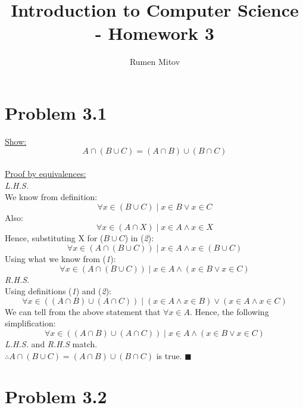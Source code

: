 \documentclass{article}
\title{\vspace{-2cm}Introduction to Computer Science - Homework 3}
\author{Rumen Mitov}
\begin{document}
\maketitle

\section*{Problem 3.1}
\underline{Show:} \[ A \cap (B \cup C) = (A \cap B) \cup (B \cap C)\] \\
\underline{Proof by equivalences:} \\
\textit{L.H.S.} \\
We know from definition: \\
\begin{equation}
\forall x \in (B \cup C) \mid x \in B \lor x \in C
\end{equation}
Also: \\
\begin{equation}
\forall x \in (A \cap X) \mid x \in A \land x \in X
\end{equation}
Hence, substituting X for ($B \cup C$) in (\textit{2}): \\
\[
\forall x \in (A \cap (B \cup C)) \mid x \in A \land x \in (B \cup C)
\]
Using what we know from (\textit{1}): \\
\[
\forall x \in (A \cap (B \cup C)) \mid x \in A \land (x \in B \lor x \in C)
\]
\textit{R.H.S.} \\
Using definitions (\textit{1}) and (\textit{2}): \\
\[
\forall x \in ((A \cap B) \cup (A \cap C)) \mid (x \in A \land x \in B) \lor (x \in A \land x \in C)
\]
We can tell from the above statement that $\forall x \in A$. Hence, the following simplification: \\
\[
\forall x \in ((A \cap B) \cup (A \cap C)) \mid x \in A \land (x \in B \lor x \in C)
\]
\textit{L.H.S.} and \textit{R.H.S} match. \\
$\therefore A \cap (B \cup C) = (A \cap B) \cup (B \cap C)$ is true. $\blacksquare$ \\

\section*{Problem 3.2}
\end{document}
